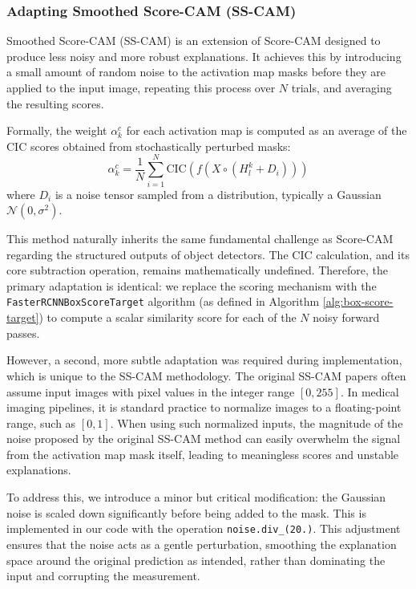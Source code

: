 \subsubsection{Adapting Smoothed Score-CAM (SS-CAM)}
\label{subsubsec:adapting_sscam}

Smoothed Score-CAM (SS-CAM) is an extension of Score-CAM designed to produce less noisy and more robust explanations. It achieves this by introducing a small amount of random noise to the activation map masks before they are applied to the input image, repeating this process over $N$ trials, and averaging the resulting scores.

Formally, the weight $\alpha^{c}_{k}$ for each activation map is computed as an average of the CIC scores obtained from stochastically perturbed masks:
\begin{equation}
    \alpha^{c}_{k} = \frac{1}{N} \sum_{i=1}^{N} \text{CIC}\left(f\left(X \circ \left(H^{k}_{l} + D_i\right)\right)\right)
    \label{eq:sscam_weight}
\end{equation}
where $D_i$ is a noise tensor sampled from a distribution, typically a Gaussian $\mathcal{N}(0, \sigma^2)$.

This method naturally inherits the same fundamental challenge as Score-CAM regarding the structured outputs of object detectors. The CIC calculation, and its core subtraction operation, remains mathematically undefined. Therefore, the primary adaptation is identical: we replace the scoring mechanism with the \texttt{FasterRCNNBoxScoreTarget} algorithm (as defined in Algorithm \ref{alg:box-score-target}) to compute a scalar similarity score for each of the $N$ noisy forward passes.

However, a second, more subtle adaptation was required during implementation, which is unique to the SS-CAM methodology. The original SS-CAM papers often assume input images with pixel values in the integer range $[0, 255]$. In medical imaging pipelines, it is standard practice to normalize images to a floating-point range, such as $[0, 1]$. When using such normalized inputs, the magnitude of the noise proposed by the original SS-CAM method can easily overwhelm the signal from the activation map mask itself, leading to meaningless scores and unstable explanations.

To address this, we introduce a minor but critical modification: the Gaussian noise is scaled down significantly before being added to the mask. This is implemented in our code with the operation \texttt{noise.div\_(20.)}. This adjustment ensures that the noise acts as a gentle perturbation, smoothing the explanation space around the original prediction as intended, rather than dominating the input and corrupting the measurement.
